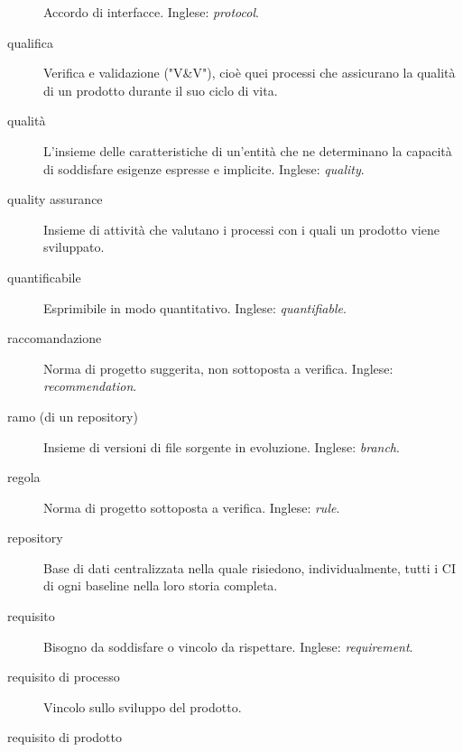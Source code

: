 \documentclass[a4paper]{article}
\begin{document}
\begin{description}
			Accordo di interfacce. Inglese: \emph{protocol}.
			
	\item[qualifica] 

			Verifica e validazione ("V\&{}V"), cioè quei processi che assicurano la qualità di un prodotto durante il suo ciclo di vita.
			
	\item[qualità] 

			L'insieme delle caratteristiche di un'entità che ne determinano la capacità di soddisfare esigenze espresse e implicite. Inglese: \emph{quality}.
			
	\item[quality assurance] 

			Insieme di attività che valutano i processi con i quali un prodotto viene sviluppato.
			
	\item[quantificabile] 

			Esprimibile in modo quantitativo. Inglese: \emph{quantifiable}.
			
	\item[raccomandazione] 

			Norma di progetto suggerita, non sottoposta a verifica. Inglese: \emph{recommendation}.
			
	\item[ramo (di un repository)] 

			Insieme di versioni di file sorgente in evoluzione. Inglese: \emph{branch}.
			
	\item[regola] 

			Norma di progetto sottoposta a verifica. Inglese: \emph{rule}.
			
	\item[repository] 

			Base di dati centralizzata nella quale risiedono, individualmente, tutti i CI di ogni baseline nella loro storia completa.
			
	\item[requisito] 

			Bisogno da soddisfare o vincolo da rispettare. Inglese: \emph{requirement}.
			
	\item[requisito di processo] 

			Vincolo sullo sviluppo del prodotto.
			
	\item[requisito di prodotto] 


\end{description}
\end{document}
